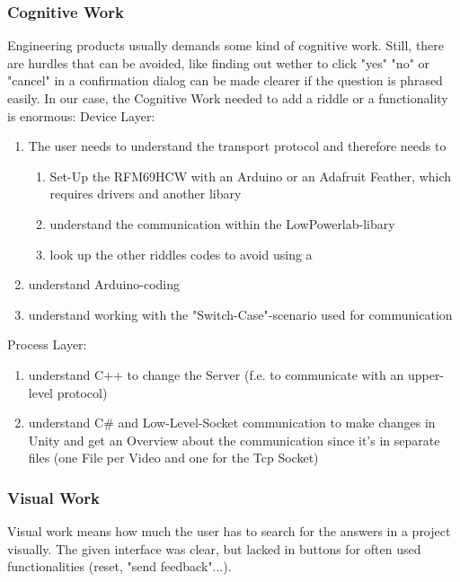 \subsubsection{Cognitive Work}
Engineering products usually demands some kind of cognitive work. Still, there are hurdles that can be avoided,
like finding out wether to click "yes" "no" or "cancel" in a confirmation dialog can be made clearer if the question is phrased easily.
In our case, the Cognitive Work needed to add a riddle or a functionality is enormous:
Device Layer:
\begin{enumerate}
    \item The user needs to understand the transport protocol and therefore needs to 
    \begin{enumerate}
        \item Set-Up the RFM69HCW with an Arduino or an Adafruit Feather, which requires drivers and another libary
        \item understand the communication within the LowPowerlab-libary
        \item look up the other riddles codes to avoid using a %
    \end{enumerate}   
    \item understand Arduino-coding 
    \item understand working with the "Switch-Case"-scenario used for communication 
\end{enumerate}  
Process Layer:
\begin{enumerate}
    \item understand C++ to change the Server (f.e. to communicate with an upper-level protocol)
    \item understand C\# and Low-Level-Socket communication to make changes in Unity 
    and get an Overview about the communication since it's in separate files (one File per Video and one for the Tcp Socket) 
\end{enumerate}  

\subsubsection{Visual Work}
Visual work means how much the user has to search for the answers in a project visually.
The given interface was clear, but lacked in buttons for often used functionalities (reset, "send feedback"...).

